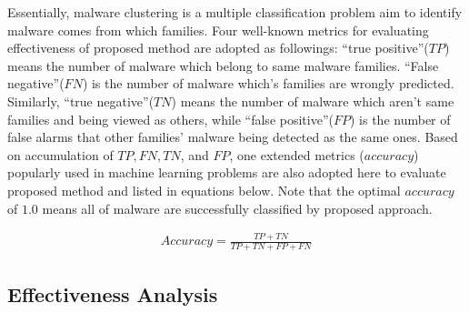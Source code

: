 Essentially, malware clustering is a multiple classification problem aim to identify malware comes from which families. Four well-known metrics for evaluating effectiveness of proposed method are adopted as followings: ``true positive''($TP$) means the number of malware which belong to same malware families. ``False negative''($FN$) is the number of malware which's families are wrongly predicted. Similarly, ``true negative''($TN$) means the number of malware which aren't same families and being viewed as others, while ``false positive''($FP$) is the number of false alarms that other families' malware being detected as the same ones. Based on accumulation of $TP, FN, TN$, and $FP$, one extended metrics ($accuracy$) popularly used in machine learning problems are also adopted here to evaluate proposed method and listed in equations below. Note that the optimal $accuracy$ of $1.0$ means all of malware are successfully classified by proposed approach. 

\begin{eqnarray}
\label{eq:accuracy}
Accuracy = \frac{TP+TN}{TP+TN+FP+FN}
\end{eqnarray}

\subsection{Effectiveness Analysis}

{\color{red}{Tony, pliz show your exp graph and table here!!!}}
